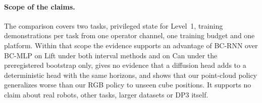 \paragraph{Scope of the claims.} The comparison covers two tasks, privileged state for
Level~1,  training demonstrations per task from one operator channel, one training budget and one
platform. Within that scope the evidence supports an advantage of BC-RNN over BC-MLP on Lift under
both interval methods and on Can under the preregistered bootstrap only, gives no evidence
that a diffusion head adds to a deterministic head with the same horizons, and shows that our point-cloud policy generalizes worse than our RGB
policy to unseen cube positions. It supports no claim about real robots, other tasks, larger
datasets or DP3 itself.
